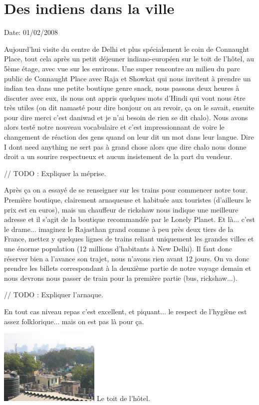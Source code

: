 \section{Des indiens dans la ville}

Date: 01/02/2008

\begin{multicols}{2}


Aujourd'hui visite du centre de Delhi et plus spécialement le coin de Connaught Place, tout cela après un petit déjeuner indiano-européen sur le toit de l’hôtel, au 5ème étage, avec vue sur les environs. Une super rencontre au milieu du parc public de Connaught Place avec Raja et Showkat qui nous invitent à prendre un indian tea dans une petite boutique genre snack, nous passons deux heures à discuter avec eux, ils nous ont appris quelques mots d’Hindi qui vont nous être très utiles (on dit namasté pour dire bonjour ou au revoir, ça on le savait, ensuite pour dire merci c’est daniwad et je n’ai besoin de rien se dit chalo). Nous avons alors testé notre nouveau vocabulaire et c’est impressionnant de voire le changement de réaction des gens quand on leur dit un mot dans leur langue. Dire I dont need anything ne sert pas à grand chose alors que dire chalo nous donne droit a un sourire respectueux et aucun insistement de la part du vendeur.

// TODO : Expliquer la méprise.

Après ça on a essayé de se renseigner sur les trains pour commencer notre tour. Première boutique, clairement arnaqueuse et habituée aux touristes (d’ailleurs le prix est en euros), mais un chauffeur de rickshaw nous indique une meilleure adresse et il s’agit de la boutique recommandée par le Lonely Planet. Et là... c’est le drame... imaginez le Rajasthan grand comme à peu près deux tiers de la France, mettez y quelques lignes de trains reliant uniquement les grandes villes et une énorme population (12 millions d'habitants à New Delhi). Il faut donc réserver bien a l’avance son trajet, nous n’avons rien avant 12 jours. On va donc prendre les billets correspondant à la deuxième partie de notre voyage demain et nous devrons nous passer de train pour la première partie (bus, rickshaw...).

// TODO : Expliquer l'arnaque.

En tout cas niveau repas c’est excellent, et piquant... le respect de l’hygiène est assez folklorique... mais on est pas là pour ça.

\hspace*{-0.65cm}
\includegraphics[width=4.8cm]{articles/Des-indiens-dans-la-ville/toithotel.jpg}
Le toit de l'hôtel.


\end{multicols}
